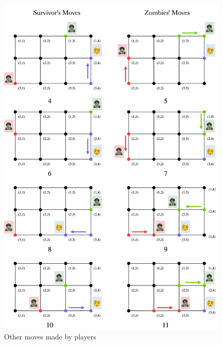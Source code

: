 \documentclass[1p]{elsarticle}
\begin{document}
\begin{figure}[h!]
	\centering
	\includegraphics[width=1\linewidth]{fig/p34m6.png}
	\caption{Other moves made by players}
	\label{fig:p6}
\end{figure}

	
\end{document}
